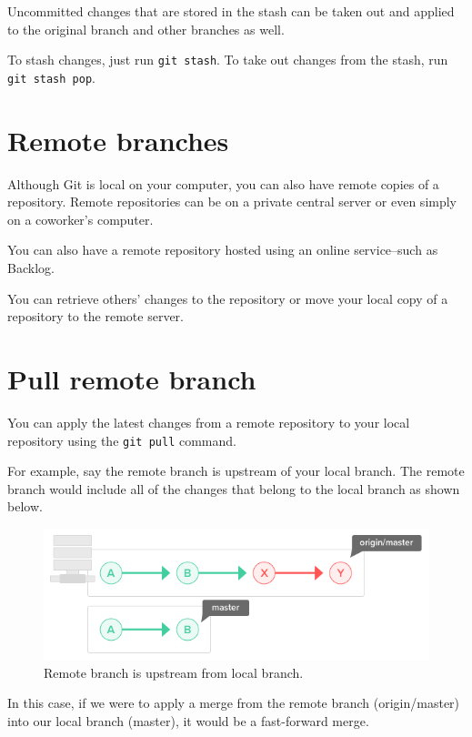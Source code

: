 \documentclass[10pt,a4paper,english]{report}
\begin{document}
    Uncommitted changes that are stored in the stash can be taken out and applied to the original branch and other branches as well.

    To stash changes, just run \verb|git stash|. To take out changes from the stash, run \verb|git stash pop|.

\chapter{Remote branches}

    Although Git is local on your computer, you can also have remote copies of a repository. Remote repositories can be on a private central server or even simply on a coworker's computer.

    You can also have a remote repository hosted using an online service–such as Backlog.

    You can retrieve others' changes to the repository or move your local copy of a repository to the remote server.

\chapter{Pull remote branch}
    \label{chap:pull-remote}

    You can apply the latest changes from a remote repository to your local repository using the \verb|git pull| command.

    For example, say the remote branch is upstream of your local branch. The remote branch would include all of the changes that belong to the local branch as shown below.

    \begin{figure}[ht]
    \begin{center}
    \includegraphics[scale=0.5]{images/pull_remote_branch_001.png}
    \end{center}
    \caption{Remote branch is upstream from local branch.}
    \end{figure}

    In this case, if we were to apply a merge from the remote branch (origin/master) into our local branch (master), it would be a fast-forward merge.
\end{document}
